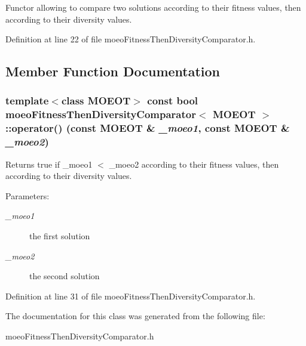 Functor allowing to compare two solutions according to their fitness values, then according to their diversity values. 



Definition at line 22 of file moeo\-Fitness\-Then\-Diversity\-Comparator.h.

\subsection{Member Function Documentation}
\subsubsection{\setlength{\rightskip}{0pt plus 5cm}template$<$class MOEOT$>$ const bool \bf{moeo\-Fitness\-Then\-Diversity\-Comparator}$<$ MOEOT $>$::operator() (const MOEOT \& {\em \_\-moeo1}, const MOEOT \& {\em \_\-moeo2})\hspace{0.3cm}{\tt  [inline]}}\label{classmoeoFitnessThenDiversityComparator_087856d1a7d81f242e95591d694e3ef6}


Returns true if \_\-moeo1 $<$ \_\-moeo2 according to their fitness values, then according to their diversity values. 

\begin{Desc}
\item[Parameters:]
\begin{description}
\item[{\em \_\-moeo1}]the first solution \item[{\em \_\-moeo2}]the second solution \end{description}
\end{Desc}


Definition at line 31 of file moeo\-Fitness\-Then\-Diversity\-Comparator.h.

The documentation for this class was generated from the following file:\begin{CompactItemize}
\item 
moeo\-Fitness\-Then\-Diversity\-Comparator.h\end{CompactItemize}
